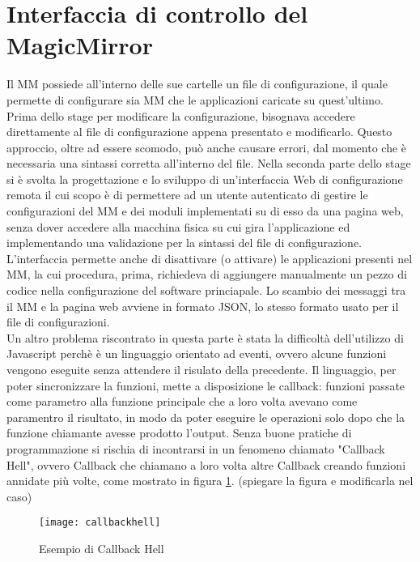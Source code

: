 \section{Interfaccia di controllo del MagicMirror}
Il MM possiede all'interno delle sue cartelle un file di configurazione, il quale permette
di configurare sia MM che le applicazioni caricate su quest'ultimo.
Prima dello stage per modificare la configurazione, bisognava accedere direttamente al file di configurazione
appena presentato e modificarlo. Questo approccio, oltre ad essere scomodo, può anche
causare errori, dal momento che è necessaria una sintassi corretta all'interno del file.
Nella seconda parte dello stage si \`e svolta la progettazione e lo sviluppo di un'interfaccia Web di configurazione remota
il cui scopo \`e di permettere ad un utente autenticato di gestire
le configurazioni del MM e dei moduli implementati su di esso da una pagina web,
senza dover accedere alla macchina fisica su cui gira l'applicazione ed implementando
una validazione per la sintassi del file di configurazione.
L'interfaccia permette anche di disattivare (o attivare) le applicazioni presenti nel MM,
la cui procedura, prima, richiedeva di aggiungere manualmente un pezzo di codice nella
configurazione del software princiapale.
Lo scambio dei messaggi tra il MM e la pagina web avviene in formato JSON, lo stesso formato
usato per il file di configurazioni.\\
Un altro problema riscontrato in questa parte è stata la difficoltà dell'utilizzo di Javascript
perchè \`e un linguaggio orientato ad eventi, ovvero alcune funzioni vengono eseguite senza attendere
il risulato della precedente. Il linguaggio, per poter sincronizzare la funzioni, mette a disposizione
le callback: funzioni passate come parametro alla funzione principale che a loro volta avevano come paramentro il risultato,
in modo da poter eseguire le operazioni solo dopo che la funzione chiamante avesse prodotto l'output.
Senza buone pratiche di programmazione si rischia di incontrarsi in un fenomeno chiamato "Callback Hell", ovvero Callback che chiamano a loro volta
altre Callback creando funzioni annidate pi\`u volte, come mostrato in figura \ref{fig:hell}.
(spiegare la figura e modificarla nel caso)
\\[2\baselineskip]
\begin{figure}[h]
    \texttt{[image: callbackhell]}
    \caption{Esempio di Callback Hell}
    \label{fig:hell}
\end{figure}
